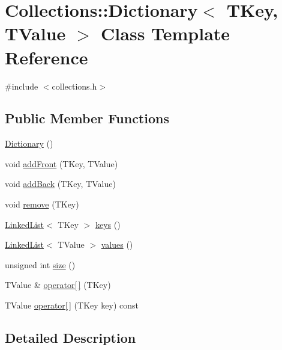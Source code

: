 \hypertarget{class_collections_1_1_dictionary}{}\section{Collections\+:\+:Dictionary$<$ T\+Key, T\+Value $>$ Class Template Reference}
\label{class_collections_1_1_dictionary}


{\ttfamily \#include $<$collections.\+h$>$}

\subsection*{Public Member Functions}
\begin{DoxyCompactItemize}
\item 
\hyperlink{class_collections_1_1_dictionary_a772de3b4b0a38cfbc18f84fb249364b8}{Dictionary} ()
\item 
void \hyperlink{class_collections_1_1_dictionary_a579608263d8579d4664d8cf393e54c00}{add\+Front} (T\+Key, T\+Value)
\item 
void \hyperlink{class_collections_1_1_dictionary_a097c05648ba47cb5da4f81fbffd047f4}{add\+Back} (T\+Key, T\+Value)
\item 
void \hyperlink{class_collections_1_1_dictionary_a761db4a7547c513bb9df5f91e7367c73}{remove} (T\+Key)
\item 
\hyperlink{class_collections_1_1_linked_list}{Linked\+List}$<$ T\+Key $>$ \hyperlink{class_collections_1_1_dictionary_a2c8e857e82c6cf00f36a745e48b69722}{keys} ()
\item 
\hyperlink{class_collections_1_1_linked_list}{Linked\+List}$<$ T\+Value $>$ \hyperlink{class_collections_1_1_dictionary_a0c886eb7be8ffb9eff8ba66d901ec9e0}{values} ()
\item 
unsigned int \hyperlink{class_collections_1_1_dictionary_a7f1d63bbe511321336d9a2cd18fd9166}{size} ()
\item 
T\+Value \& \hyperlink{class_collections_1_1_dictionary_af1902b74664715fc19fd2d8944f2d65c}{operator\mbox{[}$\,$\mbox{]}} (T\+Key)
\item 
T\+Value \hyperlink{class_collections_1_1_dictionary_a74c0362900e4d8084baf72c6a58105fc}{operator\mbox{[}$\,$\mbox{]}} (T\+Key key) const
\end{DoxyCompactItemize}


\subsection{Detailed Description}
